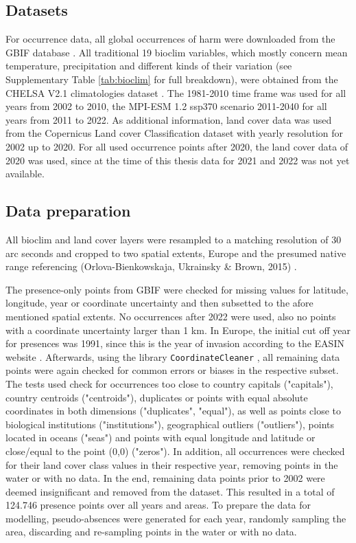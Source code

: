 \documentclass[12pt,a4paper]{article}
\begin{document}
\subsection{Datasets} \label{ssec:datasets}
For occurrence data, all global occurrences of \gls{harm} were downloaded from the GBIF database \autocite{GBIFaxyridisdataset}.
All traditional 19 bioclim variables, which mostly concern mean temperature, precipitation and different kinds of their variation (see Supplementary Table \ref{tab:bioclim} for full breakdown), were obtained from the CHELSA V2.1 climatologies dataset \autocite{karger2017CHELSApaper, CHELSAbioclimdataset}.
The 1981-2010 time frame was used for all years from 2002 to 2010, the MPI-ESM 1.2 ssp370 scenario 2011-2040 for all years from 2011 to 2022.
As additional information, land cover data was used from the Copernicus Land cover Classification dataset \autocite{COPlandcoverdataset}  with yearly resolution for 2002 up to 2020.
For all used occurrence points after 2020, the land cover data of 2020 was used, since at the time of this thesis data for 2021 and 2022 was not yet available.

\subsection{Data preparation} \label{ssec:datapreparation}
All bioclim and land cover layers were resampled to a matching resolution of 30 arc seconds and cropped to two spatial extents, Europe and the presumed native range referencing (Orlova-Bienkowskaja, Ukrainsky \& Brown, 2015) \autocite{orlova2015harmonia}.

The presence-only points from GBIF were checked for missing values for latitude, longitude, year or coordinate uncertainty and then subsetted to the afore mentioned spatial extents.
No occurrences after 2022 were used, also no points with a coordinate uncertainty larger than 1 km.
In Europe, the initial cut off year for presences was 1991, since this is the year of invasion according to the EASIN website \autocite{EASINintroharm}.
Afterwards, using the library \texttt{CoordinateCleaner} \autocite{zizka2019coordinatecleaner}, all remaining data points were again checked for common errors or biases in the respective subset.
The tests used check for occurrences too close to country capitals ("capitals"), country centroids ("centroids"), duplicates or points with equal absolute coordinates in both dimensions ("duplicates", "equal"), as well as points close to biological institutions ("institutions"), geographical outliers ("outliers"), points located in oceans ("seas") and points with equal longitude and latitude or close/equal to the point (0,0) ("zeros").
In addition, all occurrences were checked for their land cover class values in their respective year, removing points in the water or with no data.
In the end, remaining data points prior to 2002 were deemed insignificant and removed from the dataset.
This resulted in a total of 124.746 presence points over all years and areas.
To prepare the data for modelling, pseudo-absences were generated for each year, randomly sampling the area, discarding and re-sampling points in the water or with no data.
\end{document}
